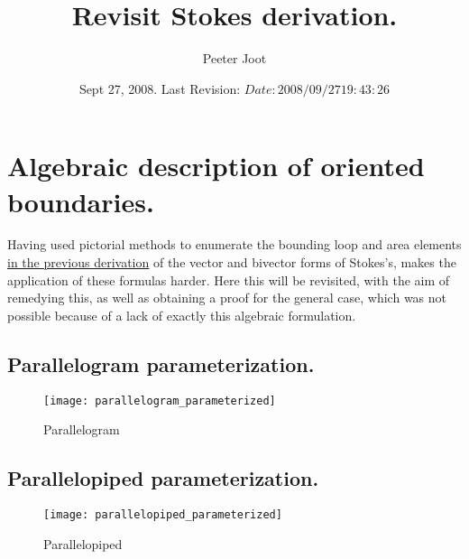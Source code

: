\documentclass{article}
\title{ Revisit Stokes derivation. }
\author{Peeter Joot}
\date{ Sept 27, 2008.  Last Revision: $Date: 2008/09/27 19:43:26 $ }
\begin{document}
\maketitle{}

\tableofcontents

\section{ Algebraic description of oriented boundaries. }

Having used pictorial methods to enumerate the bounding loop and area elements 
\href{http://www.geocities.com/peeter_joot/geometric_algebra/vector_integral_relations.pdf}{
in the previous derivation} of the vector and bivector forms of Stokes's, makes the application
of these formulas harder.  Here this will be revisited, with the aim of remedying this, as well as
obtaining a proof for the general case, which was not possible because of a lack of exactly this
algebraic formulation.

\subsection{ Parallelogram parameterization. }

\begin{figure}[htp]
\centering
\texttt{[image: parallelogram\_parameterized]}
\caption{Parallelogram}\label{fig:parallelogram}
\end{figure}

\subsection{ Parallelopiped parameterization. }

\begin{figure}[htp]
\centering
\texttt{[image: parallelopiped\_parameterized]}
\caption{Parallelopiped}\label{fig:parallelopiped}
\end{figure}
\end{document}
